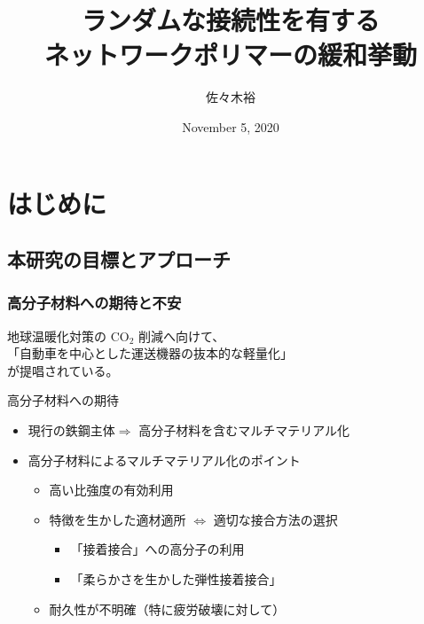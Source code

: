 \documentclass[12pt, dvipdfmx]{beamer}
\title
[ランダムな接続性を有するネットワークポリマーの緩和挙動]
{ランダムな接続性を有する\\ネットワークポリマーの緩和挙動}
\author[東亞合成　佐々木]{佐々木裕}
\institute[東亞合成]{東亞合成}
\date{November 5, 2020}
\begin{document}
\begin{frame}\frametitle{}
	\titlepage
\end{frame}

\section{はじめに}
\subsection{本研究の目標とアプローチ}

\begin{frame}
	\frametitle{高分子材料への期待と不安}
	地球温暖化対策の CO$_2$ 削減へ向けて、\\
	{\color{red}「自動車を中心とした運送機器の抜本的な軽量化」}
	\\
	が提唱されている。
	\begin{block}{高分子材料への期待}
		\begin{itemize}
			\item 現行の鉄鋼主体$ \Rightarrow$ 高分子材料を含むマルチマテリアル化
			\item 高分子材料によるマルチマテリアル化のポイント
				\begin{itemize}
					\item 高い比強度の有効利用
					\item 特徴を生かした適材適所 $\Leftrightarrow$ 適切な接合方法の選択
						\begin{itemize}
							\item {\color{red} 「接着接合」への高分子の利用}
							\item {\color{red} 「柔らかさを生かした弾性接着接合」}
						\end{itemize}
					\item {\color{blue}耐久性が不明確（特に疲労破壊に対して）}
				\end{itemize}
		\end{itemize}
	\end{block}
\end{frame}
\end{document}
